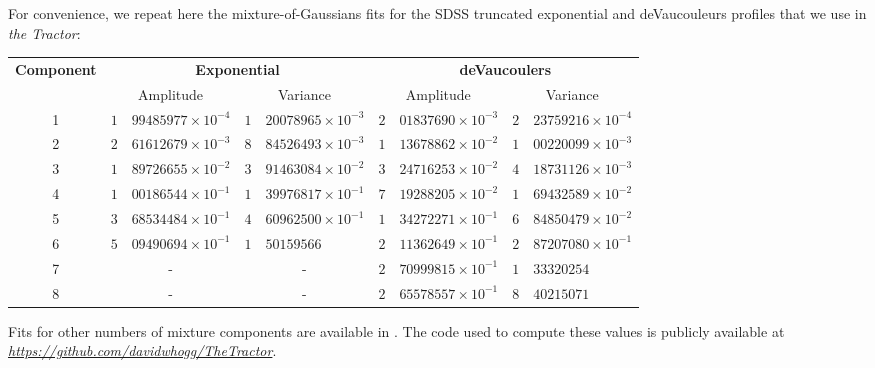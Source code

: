 \documentclass[11pt,preprint]{aastex}
\newcommand{\niceurl}[1]{\href{#1}{\textsl{#1}}}
\newcommand{\project}[1]{\textsl{#1}}
\begin{document}

For convenience, we repeat here the mixture-of-Gaussians fits for the
SDSS truncated exponential and deVaucouleurs profiles that we use in
\project{the Tractor}:
\begin{center}
\begin{tabular}{cr@{.}lr@{.}lr@{.}lr@{.}l}
\hline
\textbf{Component} &
\multicolumn{4}{c}{\textbf{Exponential}} & 
\multicolumn{4}{c}{\textbf{deVaucoulers}} \\
& \multicolumn{2}{c}{Amplitude}
& \multicolumn{2}{c}{Variance}
& \multicolumn{2}{c}{Amplitude}
& \multicolumn{2}{c}{Variance} \\
\hline
1 & 
$1$ & $99485977 \times 10^{-4}$
&
$1$ & $20078965 \times 10^{-3}$
&
$2$ & $01837690 \times 10^{-3}$
&
$2$ & $23759216 \times 10^{-4}$
\\
%
2 &
$2$ & $61612679 \times 10^{-3}$
&
$8$ & $84526493 \times 10^{-3}$
&
$1$ & $13678862 \times 10^{-2}$
&
$1$ & $00220099 \times 10^{-3}$
\\
%
3 &
$1$ & $89726655 \times 10^{-2}$
&
$3$ & $91463084 \times 10^{-2}$
&
$3$ & $24716253 \times 10^{-2}$
&
$4$ & $18731126 \times 10^{-3}$
\\
%
4 &
$1$ & $00186544 \times 10^{-1}$
&
$1$ & $39976817 \times 10^{-1}$
&
$7$ & $19288205 \times 10^{-2}$
&
$1$ & $69432589 \times 10^{-2}$
\\
%
5 &
$3$ & $68534484 \times 10^{-1}$
&
$4$ & $60962500 \times 10^{-1}$
&
$1$ & $34272271 \times 10^{-1}$
&
$6$ & $84850479 \times 10^{-2}$
\\
%
6 &
$5$ & $09490694 \times 10^{-1}$
&
$1$ & $50159566$
&
$2$ & $11362649 \times 10^{-1}$
&
$2$ & $87207080 \times 10^{-1}$
\\
%
7 &
\multicolumn{2}{c}{-} &
\multicolumn{2}{c}{-} &
$2$ & $70999815 \times 10^{-1}$
&
$1$ & $33320254$
\\
%
8 &
\multicolumn{2}{c}{-} &
\multicolumn{2}{c}{-} &
$2$ & $65578557 \times 10^{-1}$
&
$8$ & $40215071$
\\
\hline
\end{tabular}
\end{center}
Fits for other numbers of mixture components are available in
\cite{moggalaxy}.  The code used to compute these values is publicly
available at \niceurl{https://github.com/davidwhogg/TheTractor}.
\end{document}
